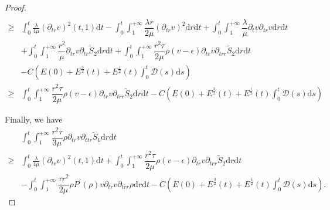 \documentclass[10pt,reqno]{amsart}
\numberwithin{equation}{section}
\begin{document}
\begin{proof}
\begin{equation}
\begin{aligned}
				\\
				\geq &
				\int_{0}^{t}\frac{\lambda}{4\mu} (\partial_{tr}v)^2(t,1)\mathrm{d} t
				-\int_{0}^{t}\int_{1}^{+\infty}\dfrac{\lambda r}{2\mu} (\partial_{tr}v)^2\mathrm{d}r\mathrm{d} t
				+\int_{0}^{t}\int_{1}^{+\infty}\dfrac{\lambda}{\mu}  \partial_{t}v \partial_{tr}v \mathrm{d}r\mathrm{d} t
				\\
				&+\int_{0}^{t}\int_{1}^{+\infty}\dfrac{r^2}{\mu} \partial_{tr}v\partial_{tr} \tilde{S}_2 \mathrm{d}r\mathrm{d} t
				+\int_{0}^{t}\int_{1}^{+\infty}\dfrac{r^2\tau}{2\mu} \rho(v-\epsilon) \partial_{tr}v\partial_{trr} \tilde{S}_2 \mathrm{d}r\mathrm{d} t\\
				&-C\left(E(0)+ E^{\frac{3}{2}}(t)+ E^{\frac{1}{2}}(t) \int_{0}^{t}\mathcal{D}(s)\mathrm{d}s\right)\\
				\geq &
				\int_{0}^{t}\int_{1}^{+\infty}\dfrac{r^2\tau}{2\mu} \rho(v-\epsilon) \partial_{tr}v\partial_{trr} \tilde{S}_2 \mathrm{d}r\mathrm{d}t
				-C\left(E(0)+ E^{\frac{3}{2}}(t)+ E^{\frac{1}{2}}(t) \int_{0}^{t}\mathcal{D}(s)\mathrm{d}s\right)
			\end{aligned}
		\end{equation}
		
		Finally, we have
		\begin{equation}
			\begin{aligned}
				&\int_{0}^{t}\int_{1}^{+\infty}\dfrac{r^2\tau}{3\mu}\rho\partial_{tr} v\partial_{ttr} \tilde{S}_1\mathrm{d}r\mathrm{d}t\\
				\geq&
				\int_{0}^{t}\frac{\lambda}{4\mu} (\partial_{tr}v)^2(t,1)\mathrm{d} t
				+\int_{0}^{t}\int_{1}^{+\infty}\dfrac{r^2\tau}{2\mu} \rho(v-\epsilon) \partial_{tr}v\partial_{trr} \tilde{S}_2 \mathrm{d}r\mathrm{d}t\\
				&-\int_{0}^{t}\int_{1}^{+\infty}\dfrac{\tau r^2}{2\mu}\rho P^{\prime}(\rho)
				v\partial_{tr}v\partial_{trr}\rho\mathrm{d}r\mathrm{d}t
				-C\left(E(0)+ E^{\frac{3}{2}}(t)+ E^{\frac{1}{2}}(t) \int_{0}^{t}\mathcal{D}(s)\mathrm{d}s\right).	
			\end{aligned}
		\end{equation}	
		

\end{proof}
\end{document}
